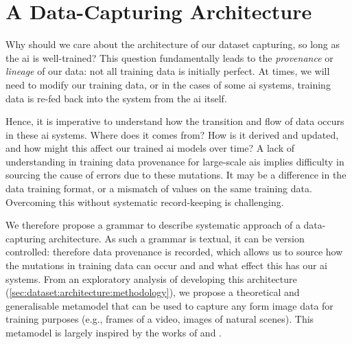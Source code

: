 \section{A Data-Capturing Architecture}
\label{sec:dataset:architecture}

Why should we care about the architecture of our dataset capturing, so long as the \gls{ai} is well-trained? This question fundamentally leads to the \textit{provenance} or \textit{lineage} of our data: not all training data is initially perfect. At times, we will need to modify our training data, or in the cases of some \gls{ai} systems, training data is re-fed back into the system from the \gls{ai} itself. 

Hence, it is imperative to understand how the transition and flow of data occurs \citep{Cui:2003im,Ikeda:2009ca,Buneman:2000bn} in these \gls{ai} systems. Where does it comes from? How is it derived and updated, and how might this affect our trained \gls{ai} models over time? A lack of understanding in training data provenance for large-scale \glspl{ai} implies difficulty in sourcing the cause of errors due to these mutations. It may be a difference in the data training format, or a mismatch of values on the same training data. Overcoming this without systematic record-keeping is challenging.

We therefore propose a grammar to describe systematic approach of a data-capturing architecture. As such a grammar is textual, it can be version controlled: therefore data provenance is recorded, which allows us to source how the mutations in training data can occur and and what effect this has our \gls{ai} systems. From an exploratory analysis of developing this architecture (\cref{sec:dataset:architecture:methodology}), we propose a theoretical and generalisable metamodel that can be used to capture any form image data for training purposes (e.g., frames of a video, images of natural scenes). This metamodel is largely inspired by the works of \citet{Wickham:2010hy, Wickham:2007tu} and \citet{Moody:2009vo}.


\clearpage


